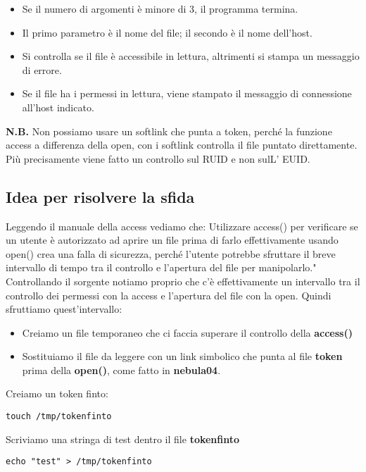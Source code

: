 \begin{itemize}
    \item Se il numero di argomenti è minore di 3, il programma termina.
    \item Il primo parametro è il nome del file; il secondo è il nome dell'host.
    \item Si controlla se il file è accessibile in lettura, altrimenti si stampa un messaggio di errore.
    \item Se il file ha i permessi in lettura, viene stampato il messaggio di connessione all'host indicato.
\end{itemize}
\textbf{N.B.} Non possiamo usare un softlink che punta a token, perché la funzione access a differenza della open, con i softlink controlla il file puntato direttamente. Più precisamente viene fatto un controllo sul RUID e non sulL' EUID.

\subsection{Idea per risolvere la sfida}
Leggendo il manuale della access vediamo che: Utilizzare access() per verificare se un utente è autorizzato ad aprire un file prima di farlo effettivamente usando open() crea una falla di sicurezza, perché l'utente potrebbe sfruttare il breve intervallo di tempo tra il controllo e l'apertura del file per manipolarlo."
Controllando il sorgente notiamo proprio che c'è effettivamente un intervallo tra il controllo dei permessi con la access e l'apertura del file con la open. Quindi sfruttiamo quest'intervallo:
\begin{itemize}
    \item Creiamo un file temporaneo che ci faccia superare il controllo della \textbf{access()}
    \item Sostituiamo il file da leggere con un link simbolico che punta al file \textbf{token} prima della \textbf{open()}, come fatto in \textbf{nebula04}.
\end{itemize}
Creiamo un token finto:
\begin{lstlisting}[style=bashstyle]
touch /tmp/tokenfinto
\end{lstlisting}
Scriviamo una stringa di test dentro il file \textbf{tokenfinto}
\begin{lstlisting}[style=bashstyle]
echo "test" > /tmp/tokenfinto
\end{lstlisting}

